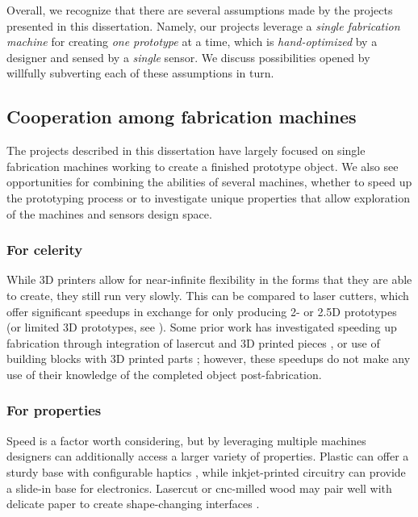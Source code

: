 Overall, we recognize that there are several assumptions made by the projects presented in this dissertation. Namely, our projects leverage a \emph{single fabrication machine} for creating \emph{one prototype} at a time, which is \emph{hand-optimized} by a designer and sensed by a \emph{single} sensor. We discuss possibilities opened by willfully subverting each of these assumptions in turn.

\subsection{Cooperation among fabrication machines}

The projects described in this dissertation have largely focused on single fabrication machines working to create a finished prototype object. We also see opportunities for combining the abilities of several machines, whether to speed up the prototyping process or to investigate unique properties that allow exploration of the machines and sensors design space.

    \subsubsection{For celerity}

    While 3D printers allow for near-infinite flexibility in the forms that they are able to create, they still run very slowly. This can be compared to laser cutters, which offer significant speedups in exchange for only producing 2- or 2.5D prototypes (or limited 3D prototypes, see \cite{mueller-laserorigami}). Some prior work has investigated speeding up fabrication through integration of lasercut and 3D printed pieces \cite{beyer-platener}, or use of building blocks with 3D printed parts \cite{mueller-fabrickation}; however, these speedups do not make any use of their knowledge of the completed object post-fabrication.

    \subsubsection{For properties}
    
    Speed is a factor worth considering, but by leveraging multiple machines designers can additionally access a larger variety of properties. Plastic can offer a sturdy base with configurable haptics \cite{torres-hapticprint}, while inkjet-printed circuitry can provide a slide-in base for electronics. Lasercut or cnc-milled wood may pair well with delicate paper to create shape-changing interfaces \cite{yao-pneui}.

